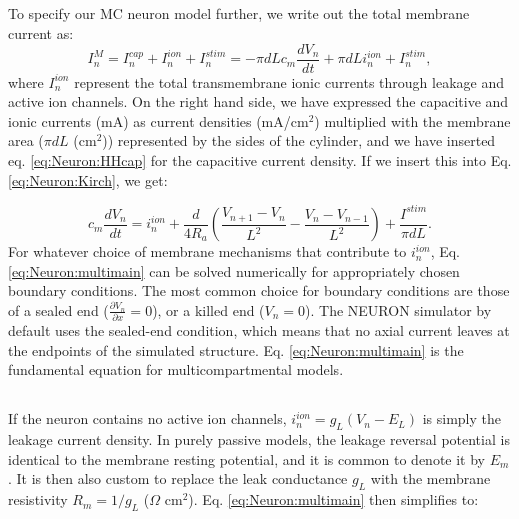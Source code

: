 \subsection{}
\label{sec:Neuron:Active_multicomp}
To specify our MC neuron model further, we write out the total membrane current as:
\begin{equation}
I^M_n = I_n^{cap} + I_n^{ion} + I_n^{stim} = -\pi d L c_m \frac{dV_n}{dt} + \pi d L i_n^{ion} + I_n^{stim}, 
\label{eq:Neuron:Imemb}
\end{equation}
where $I_n^{ion}$ represent the total transmembrane ionic currents through leakage and active ion channels. On the right hand side, we have expressed the capacitive and ionic currents (mA) as current densities (mA/cm$^2$) multiplied with the membrane area ($\pi d L$ (cm$^2$)) represented by the sides of the cylinder, and we have inserted eq. \ref{eq:Neuron:HHcap} for the capacitive current density. If we insert this into Eq. \ref{eq:Neuron:Kirch}, we get:

\begin{equation}
c_m \frac{dV_n}{dt} = i_n^{ion} + \frac{d}{4R_a}\left(\frac{V_{n+1}-V_n}{L^2} - \frac{V_n-V_{n-1}}{L^2} \right) + \frac{I^{stim}}{\pi d L}.
\label{eq:Neuron:multimain}
\end{equation}
For whatever choice of membrane mechanisms that contribute to $i_n^{ion}$, Eq. \ref{eq:Neuron:multimain} can be solved numerically for appropriately chosen boundary conditions. The most common choice for boundary conditions are those of a sealed end ($\frac{\partial V_n}{\partial x} = 0$), or a killed end ($V_n=0$). The NEURON simulator by default uses the sealed-end condition, which means that no axial current leaves at the endpoints of the simulated structure. Eq. \ref{eq:Neuron:multimain} is the fundamental equation for multicompartmental models.



\subsection{}
\label{sec:Neuron:Passive_multicomp}
If the neuron contains no active ion channels, $i_n^{ion} = g_L(V_n - E_L)$ is simply the leakage current density. In purely passive models, the leakage reversal potential is identical to the membrane resting potential, and it is common to denote it by $E_m$. It is then also custom to replace the leak conductance $g_L$ with the membrane resistivity $R_m = 1/g_L$ ($\Omega$ cm$^2$). Eq. \ref{eq:Neuron:multimain} then simplifies to:

